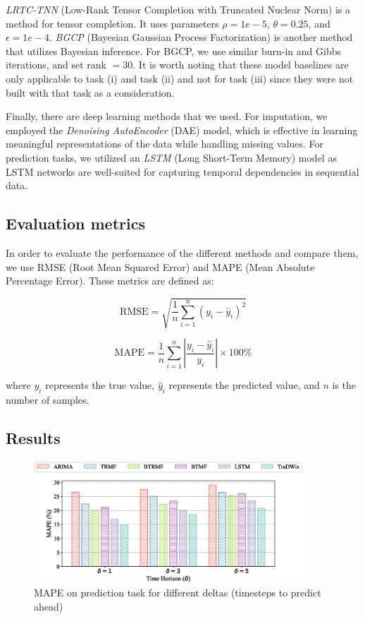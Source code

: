 \documentclass[conference]{IEEEtran}
\begin{document}
\textit{LRTC-TNN}\cite{lrtc} (Low-Rank Tensor Completion with Truncated Nuclear Norm) is a method for tensor completion. It uses parameters $\rho = 1e-5$, $\theta = 0.25$, and $\epsilon = 1e-4$. \textit{BGCP} (Bayesian Gaussian Process Factorization) is another method that utilizes Bayesian inference. For BGCP, we use similar burn-in and Gibbs iterations, and set rank $= 30$. It is worth noting that these model baselines are only applicable to task (i) and task (ii) and not for task (iii) since they were not built with that task as a consideration.

Finally, there are deep learning methods that we used. For imputation, we employed the \textit{Denoising AutoEncoder} (DAE)\cite{dae} model, which is effective in learning meaningful representations of the data while handling missing values. For prediction tasks, we utilized an \textit{LSTM}\cite{lstm} (Long Short-Term Memory) model as LSTM networks are well-suited for capturing temporal dependencies in sequential data.

\subsection{Evaluation metrics}

In order to evaluate the performance of the different methods and compare them, we use RMSE (Root Mean Squared Error) and MAPE (Mean Absolute Percentage Error). These metrics are defined as:


\[
\text{RMSE} = \sqrt{\frac{1}{n} \sum_{i=1}^{n} (y_i - \hat{y}_i)^2}
\]

\[
\text{MAPE} = \frac{1}{n} \sum_{i=1}^{n} \left| \frac{y_i - \hat{y}_i}{y_i} \right| \times 100\%
\]

where \( y_i \) represents the true value, \( \hat{y}_i \) represents the predicted value, and \( n \) is the number of samples.

\subsection{Results}

\begin{figure}[]
    \centering
    \includegraphics[width=0.9\textwidth]{mape_pred.eps}
    \caption{MAPE on prediction task for different deltas (timesteps to predict ahead)}
    \label{fig:mape_pred}
\end{figure}
\end{document}
